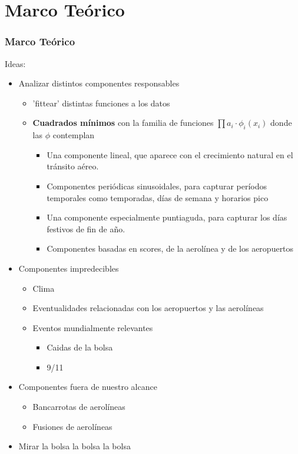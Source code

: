 \documentclass{beamer}
\begin{document}
\section{Marco Teórico}
\begin{frame}
\frametitle{Marco Teórico}

Ideas:
\begin{itemize}
	\item<2-> Analizar distintos componentes responsables
	\begin{itemize}
		\item<3-> 'fittear' distintas funciones a los datos
		\item<4-> \textbf{Cuadrados mínimos} con la familia de funciones $\prod a_i \cdot \phi_i(x_i)$ donde las $\phi$ contemplan
		\begin{itemize}	
			\item<5-> Una componente lineal, que aparece con el crecimiento natural en el tránsito aéreo.
			\item<6-> Componentes periódicas sinusoidales, para capturar períodos temporales como temporadas, días de semana y horarios pico
			\item<7-> Una componente especialmente puntiaguda, para capturar los días festivos de fin de año.
			\item<8-> Componentes basadas en scores, de la aerolínea y de los aeropuertos
		\end{itemize}
	\end{itemize}
\end{itemize}
\end{frame}
\begin{frame}
\begin{itemize}
	\item<1-> Componentes impredecibles
	\begin{itemize}
		\item<1-> Clima
		\item<1-> Eventualidades relacionadas con los aeropuertos y las aerolíneas
		\item<1-> Eventos mundialmente relevantes
		\begin{itemize}
			\item<2-> Caidas de la bolsa
			\item<2-> 9/11
		\end{itemize}
	\end{itemize}
	\item<3-> Componentes fuera de nuestro alcance
	\begin{itemize}
		\item<3-> Bancarrotas de aerolíneas
		\item<3-> Fusiones de aerolíneas
	\end{itemize}
\end{itemize}

\end{frame}
\begin{frame}
\begin{itemize}
	\item Mirar la bolsa la bolsa la bolsa
\end{itemize}


\end{frame}
\end{document}

